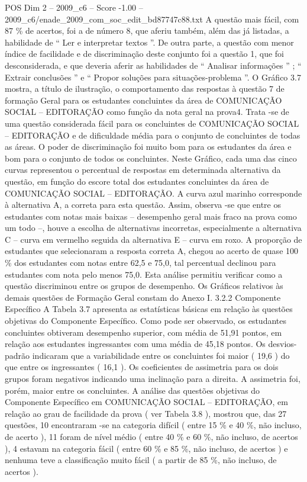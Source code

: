 \begin{textsample}{POS Dim 2 – 2009\_c6 – Score -1.00 – 2009\_c6/enade\_2009\_com\_soc\_edit\_bd87747c88.txt}
A questão mais fácil, com 87 \% de acertos, foi a de número 8, que aferiu também, além das já listadas, a habilidade de “ Ler e interpretar textos ”.
De outra parte, a questão com menor índice de facilidade e de discriminação deste conjunto foi a questão 1, que foi desconsiderada, e que deveria aferir as habilidades de “ Analisar informações ” ; “ Extrair conclusões ” e “ Propor soluções para situações-problema ”.
O Gráfico 3.7 mostra, a título de ilustração, o comportamento das respostas à questão 7 de formação Geral para os estudantes concluintes da área de COMUNICAÇÃO SOCIAL – EDITORAÇÃO como função da nota geral na prova4.
Trata -se de uma questão considerada fácil para os concluintes de COMUNICAÇÃO SOCIAL – EDITORAÇÃO e de dificuldade média para o conjunto de concluintes de todas as áreas.
O poder de discriminação foi muito bom para os estudantes da área e bom para o conjunto de todos os concluintes.
Neste Gráfico, cada uma das cinco curvas representou o percentual de respostas em determinada alternativa da questão, em função do escore total dos estudantes concluintes da área de COMUNICAÇÃO SOCIAL – EDITORAÇÃO.
A curva azul marinho corresponde à alternativa A, a correta para esta questão.
Assim, observa -se que entre os estudantes com notas mais baixas – desempenho geral mais fraco na prova como um todo –, houve a escolha de alternativas incorretas, especialmente a alternativa C – curva em vermelho seguida da alternativa E – curva em roxo.
A proporção de estudantes que selecionaram a resposta correta A, chegou ao acerto de quase 100 \% dos estudantes com notas entre 62,5 e 75,0, tal percentual declinou para estudantes com nota pelo menos 75,0.
Esta análise permitiu verificar como a questão discriminou entre os grupos de desempenho.
Os Gráficos relativos às demais questões de Formação Geral constam do Anexo I. 3.2.2 Componente Específico A Tabela 3.7 apresenta as estatísticas básicas em relação às questões objetivas do Componente Específico.
Como pode ser observado, os estudantes concluintes obtiveram desempenho superior, com média de 51,91 pontos, em relação aos estudantes ingressantes com uma média de 45,18 pontos.
Os desvios-padrão indicaram que a variabilidade entre os concluintes foi maior ( 19,6 ) do que entre os ingressantes ( 16,1 ).
Os coeficientes de assimetria para os dois grupos foram negativos indicando uma inclinação para a direita.
A assimetria foi, porém, maior entre os concluintes.
A análise das questões objetivas do Componente Específico em COMUNICAÇÃO SOCIAL – EDITORAÇÃO, em relação ao grau de facilidade da prova ( ver Tabela 3.8 ), mostrou que, das 27 questões, 10 encontraram -se na categoria difícil ( entre 15 \% e 40 \%, não incluso, de acerto ), 11 foram de nível médio ( entre 40 \% e 60 \%, não incluso, de acertos ), 4 estavam na categoria fácil ( entre 60 \% e 85 \%, não incluso, de acertos ) e nenhuma teve a classificação muito fácil ( a partir de 85 \%, não incluso, de acertos ).

\end{textsample}

